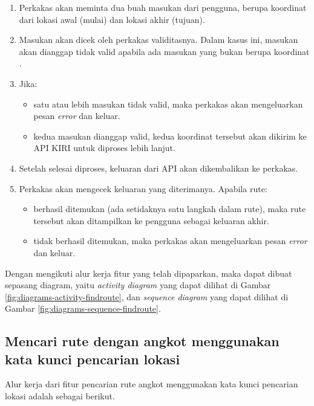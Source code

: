 \begin{enumerate}
	\item Perkakas akan meminta dua buah masukan dari pengguna, berupa koordinat \latlon\xspace dari lokasi awal (mulai) dan lokasi akhir (tujuan).
	\item Masukan akan dicek oleh perkakas validitasnya. Dalam kasus ini, masukan akan dianggap tidak valid apabila ada masukan yang bukan berupa koordinat \latlon .
	\item Jika:
	
	\begin{itemize}
		\item satu atau lebih masukan tidak valid, maka perkakas akan mengeluarkan pesan \textit{error} dan keluar.
		\item kedua masukan dianggap valid, kedua koordinat tersebut akan dikirim ke API KIRI untuk diproses lebih lanjut.
	\end{itemize}
	 
	\item Setelah selesai diproses, keluaran dari API akan dikembalikan ke perkakas.
	\item Perkakas akan mengecek keluaran yang diterimanya. Apabila rute:
	
	\begin{itemize}
		\item berhasil ditemukan (ada setidaknya satu langkah dalam rute), maka rute tersebut akan ditampilkan ke pengguna sebagai keluaran akhir.
		\item tidak berhasil ditemukan, maka perkakas akan mengeluarkan pesan \textit{error} dan keluar.
	\end{itemize}
	
\end{enumerate}
\noindent
Dengan mengikuti alur kerja fitur yang telah dipaparkan, maka dapat dibuat sepasang diagram, yaitu \textit{activity diagram} yang dapat dilihat di Gambar \ref{fig:diagrams-activity-findroute}, dan \textit{sequence diagram} yang dapat dilihat di Gambar \ref{fig:diagrams-sequence-findroute}. 

\subsection{Mencari rute dengan angkot menggunakan kata kunci pencarian lokasi}
\label{sec:design-flow-directroute}


Alur kerja dari fitur pencarian rute angkot menggunakan kata kunci pencarian lokasi adalah sebagai berikut.


